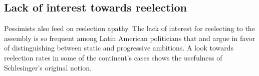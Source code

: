 \documentclass[letter,12pt]{article}
\newcommand{\mc}{\multicolumn}
\begin{document}
\subsection{Lack of interest towards reelection}

\noindent Pessimists also feed on reelection apathy. The lack of interest for reelecting to the assembly is so frequent among Latin American politicians that \citet{morgenstern.2002b} and \citet{micozziPhD2009} argue in favor of distinguishing between static and progressive ambitions. A look towards reelection rates in some of the continent's cases shows the usefulness of Schlesinger's \citeyearpar{schlesinger.1966} original notion.

\end{document}
